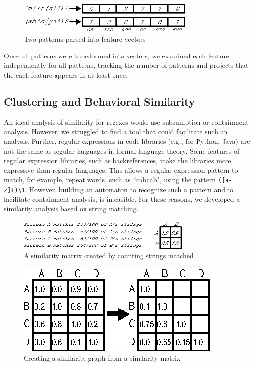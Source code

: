 \begin{figure}[tb]
\centering
\includegraphics[height=0.6in]{../illustrations/featureParsing.eps}
\caption{Two patterns parsed into feature vectors}
\label{fig:featureParsing}
\vspace{-12pt}
\end{figure}

Once all patterns were transformed into vectors, we examined each feature independently for all patterns, tracking the number of patterns and  projects that the each feature appears in at least once.




\subsection{Clustering and Behavioral Similarity}
An ideal analysis of similarity for regexes would use subsumption or containment analysis. However, we struggled to find a tool that could facilitate such an analysis. Further, regular expressions in code libraries (e.g., for Python, Java) are not the same as regular languages in formal language theory. Some features of regular expression libraries, such as backreferences, make the libraries more expressive than regular languages. This allows a regular expression pattern to match, for example, repeat words, such as ``cabcab", using the pattern {\tt ([a-z]+)\verb!\!1}. However, building an automaton to recognize such a pattern and to facilitate containment analysis, is infeasible.
For these reasons, we developed a similarity analysis based on string matching.


\begin{figure}[tb]
\centering
\includegraphics[height=0.6in]{../illustrations/minimalMatrix.eps}
\caption{A similarity matrix created by counting strings matched}
\label{fig:minimalMatrix}
\end{figure}


\begin{figure}[tb]
\centering
\includegraphics[width=0.7\columnwidth]{../illustrations/matrixToGraph.eps}
\vspace{-6pt}
\caption{Creating a similarity graph from a similarity matrix}
\vspace{-6pt}
\label{fig:matrixToGraph}
\end{figure}

